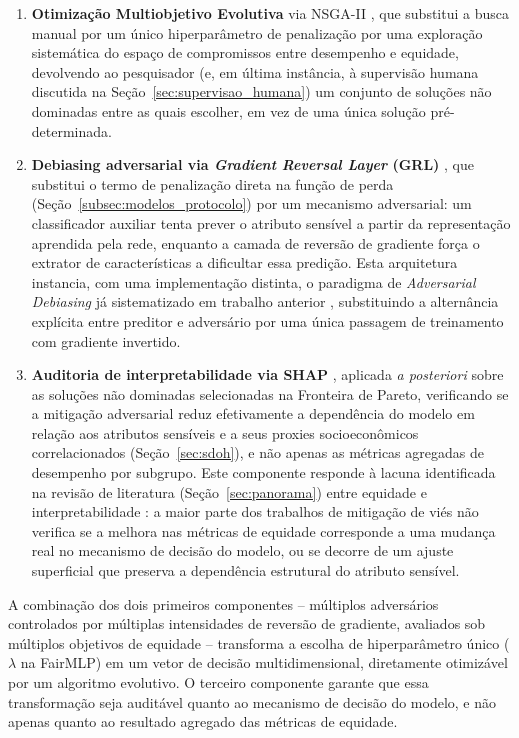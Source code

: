 \begin{enumerate}
    \item \textbf{Otimização Multiobjetivo Evolutiva} via NSGA-II \citep{deb2002fast}, que substitui a busca manual por um único hiperparâmetro de penalização por uma exploração sistemática do espaço de compromissos entre desempenho e equidade, devolvendo ao pesquisador (e, em última instância, à supervisão humana discutida na Seção~\ref{sec:supervisao_humana}) um conjunto de soluções não dominadas entre as quais escolher, em vez de uma única solução pré-determinada.
    \item \textbf{Debiasing adversarial via \textit{Gradient Reversal Layer} (GRL)} \citep{ganin2015unsupervised}, que substitui o termo de penalização direta na função de perda (Seção~\ref{subsec:modelos_protocolo}) por um mecanismo adversarial: um classificador auxiliar tenta prever o atributo sensível a partir da representação aprendida pela rede, enquanto a camada de reversão de gradiente força o extrator de características a dificultar essa predição. Esta arquitetura instancia, com uma implementação distinta, o paradigma de \textit{Adversarial Debiasing} já sistematizado em trabalho anterior \citep{zhang2018adversarial,deconstruindo}, substituindo a alternância explícita entre preditor e adversário por uma única passagem de treinamento com gradiente invertido.
    \item \textbf{Auditoria de interpretabilidade via SHAP} \citep{lundberg2017unified}, aplicada \textit{a posteriori} sobre as soluções não dominadas selecionadas na Fronteira de Pareto, verificando se a mitigação adversarial reduz efetivamente a dependência do modelo em relação aos atributos sensíveis e a seus proxies socioeconômicos correlacionados (Seção~\ref{sec:sdoh}), e não apenas as métricas agregadas de desempenho por subgrupo. Este componente responde à lacuna identificada na revisão de literatura (Seção~\ref{sec:panorama}) entre equidade e interpretabilidade \citep{meng2022interpretability,wang2020pursuit}: a maior parte dos trabalhos de mitigação de viés não verifica se a melhora nas métricas de equidade corresponde a uma mudança real no mecanismo de decisão do modelo, ou se decorre de um ajuste superficial que preserva a dependência estrutural do atributo sensível.
\end{enumerate}

A combinação dos dois primeiros componentes -- múltiplos adversários controlados por múltiplas intensidades de reversão de gradiente, avaliados sob múltiplos objetivos de equidade -- transforma a escolha de hiperparâmetro único ($\lambda$ na FairMLP) em um vetor de decisão multidimensional, diretamente otimizável por um algoritmo evolutivo. O terceiro componente garante que essa transformação seja auditável quanto ao mecanismo de decisão do modelo, e não apenas quanto ao resultado agregado das métricas de equidade.

